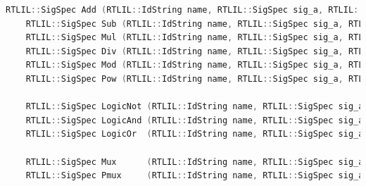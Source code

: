 \documentclass[11pt]{report}
\begin{document}
\begin{lstlisting}[language=C++]
	RTLIL::SigSpec Add (RTLIL::IdString name, RTLIL::SigSpec sig_a, RTLIL::SigSpec sig_b, bool is_signed = false, const std::string &src = "");
	RTLIL::SigSpec Sub (RTLIL::IdString name, RTLIL::SigSpec sig_a, RTLIL::SigSpec sig_b, bool is_signed = false, const std::string &src = "");
	RTLIL::SigSpec Mul (RTLIL::IdString name, RTLIL::SigSpec sig_a, RTLIL::SigSpec sig_b, bool is_signed = false, const std::string &src = "");
	RTLIL::SigSpec Div (RTLIL::IdString name, RTLIL::SigSpec sig_a, RTLIL::SigSpec sig_b, bool is_signed = false, const std::string &src = "");
	RTLIL::SigSpec Mod (RTLIL::IdString name, RTLIL::SigSpec sig_a, RTLIL::SigSpec sig_b, bool is_signed = false, const std::string &src = "");
	RTLIL::SigSpec Pow (RTLIL::IdString name, RTLIL::SigSpec sig_a, RTLIL::SigSpec sig_b, bool a_signed = false, bool b_signed = false, const std::string &src = "");

	RTLIL::SigSpec LogicNot (RTLIL::IdString name, RTLIL::SigSpec sig_a, bool is_signed = false, const std::string &src = "");
	RTLIL::SigSpec LogicAnd (RTLIL::IdString name, RTLIL::SigSpec sig_a, RTLIL::SigSpec sig_b, bool is_signed = false, const std::string &src = "");
	RTLIL::SigSpec LogicOr  (RTLIL::IdString name, RTLIL::SigSpec sig_a, RTLIL::SigSpec sig_b, bool is_signed = false, const std::string &src = "");

	RTLIL::SigSpec Mux      (RTLIL::IdString name, RTLIL::SigSpec sig_a, RTLIL::SigSpec sig_b, RTLIL::SigSpec sig_s, const std::string &src = "");
	RTLIL::SigSpec Pmux     (RTLIL::IdString name, RTLIL::SigSpec sig_a, RTLIL::SigSpec sig_b, RTLIL::SigSpec sig_s, const std::string &src = "");


\end{lstlisting}
\end{document}
